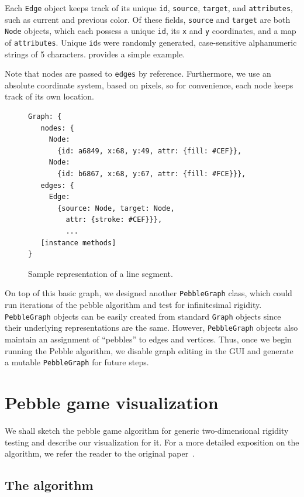 \documentclass[aps,prd,final,twocolumn,letterpaper,nofootinbib]{revtex4-1}
\begin{document}
Each \texttt{Edge} object keeps track of its unique \texttt{id}, \texttt{source}, \texttt{target}, and \texttt{attributes},
such as current and previous color.
Of these fields, \texttt{source} and \texttt{target} are both \texttt{Node} objects,
which each possess a unique \texttt{id}, its \texttt{x} and \texttt{y} coordinates,
and a map of \texttt{attributes}.
Unique \texttt{id}s were randomly generated,
case-sensitive alphanumeric strings of 5 characters.
 provides a simple example.

Note that nodes are passed to \texttt{edges} by reference.
Furthermore, we use an absolute coordinate system,
based on pixels, so for convenience, each node keeps track of its own location.

\begin{figure}[ht]
\begin{verbatim}
Graph: {
   nodes: {
     Node:
       {id: a6849, x:68, y:49, attr: {fill: #CEF}},
     Node:
       {id: b6867, x:68, y:67, attr: {fill: #FCE}}},
   edges: {
     Edge:
       {source: Node, target: Node,
         attr: {stroke: #CEF}}},
         ...
   [instance methods]
}
\end{verbatim}
\caption{Sample representation of a line segment.}
\label{fig:graphrep}
\end{figure}

On top of this basic graph,
we designed another \texttt{PebbleGraph} class,
which could run iterations of the pebble algorithm
and test for infinitesimal rigidity.
\texttt{PebbleGraph} objects can be easily created
from standard \texttt{Graph} objects since
their underlying representations are the same.
However, \texttt{PebbleGraph} objects also maintain
an assignment of ``pebbles'' to edges and vertices.
Thus, once we begin running the Pebble algorithm,
we disable graph editing in the GUI and generate a mutable \texttt{PebbleGraph}
for future steps.

\section{Pebble game visualization}
\label{sec:pebble}

We shall sketch the pebble game algorithm
for generic two-dimensional rigidity testing
and describe our visualization for it.
For a more detailed exposition on the algorithm,
we refer the reader to the original paper~\cite{jacobs97}.

\subsection{The algorithm}
\end{document}
